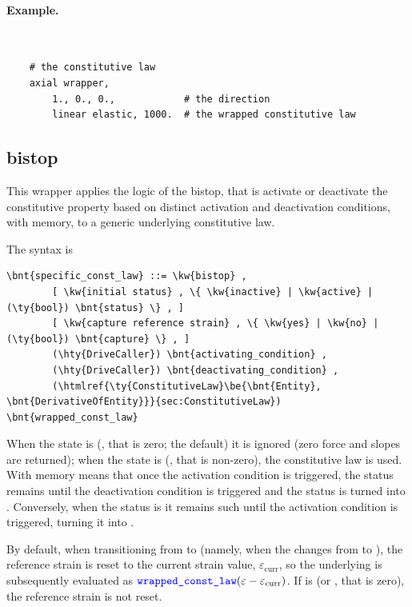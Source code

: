 \paragraph{Example.} \
\begin{verbatim}
    # the constitutive law
    axial wrapper,
        1., 0., 0.,            # the direction
        linear elastic, 1000.  # the wrapped constitutive law
\end{verbatim}


\subsection{bistop}
This wrapper applies the logic of the bistop, that is activate or deactivate
the constitutive property based on distinct activation and deactivation conditions, with memory,
to a generic underlying constitutive law.

The syntax is
\begin{Verbatim}[commandchars=\\\{\}]
    \bnt{specific_const_law} ::= \kw{bistop} ,
        [ \kw{initial status} , \{ \kw{inactive} | \kw{active} | (\ty{bool}) \bnt{status} \} , ]
        [ \kw{capture reference strain} , \{ \kw{yes} | \kw{no} | (\ty{bool}) \bnt{capture} \} , ]
        (\hty{DriveCaller}) \bnt{activating_condition} ,
        (\hty{DriveCaller}) \bnt{deactivating_condition} ,
        (\htmlref{\ty{ConstitutiveLaw}\be{\bnt{Entity}, \bnt{DerivativeOfEntity}}}{sec:ConstitutiveLaw}) \bnt{wrapped_const_law}
\end{Verbatim}
When the state is  (, that is zero; the default) it is ignored (zero force and slopes are returned);
when the state is  (\kw{true}, that is non-zero), the constitutive law is used.
With memory means that once the activation condition is triggered, the status remains  until the deactivation condition is triggered and the status is turned into .
Conversely, when the status is \kw{inactive} it remains such until the activation condition is triggered, turning it into \kw{active}.

By default, when transitioning from  to  (namely, when the  changes from  to ), the reference strain is reset to the current strain value, $\varepsilon_\text{curr}$, so the underlying  is subsequently evaluated as $\textcolor{blue}{\texttt{wrapped\_const\_law}}(\varepsilon - \varepsilon_\text{curr})$.  If  is  (or , that is zero), the reference strain is not reset.


